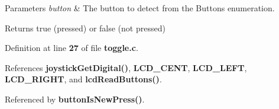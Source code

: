 \begin{DoxyParams}{Parameters}
{\em button} & The button to detect from the Buttons enumeration.\\
\hline
\end{DoxyParams}
\begin{DoxyReturn}{Returns}
true (pressed) or false (not pressed) 
\end{DoxyReturn}


Definition at line \textbf{ 27} of file \textbf{ toggle.\+c}.



References \textbf{ joystick\+Get\+Digital()}, \textbf{ L\+C\+D\+\_\+\+C\+E\+NT}, \textbf{ L\+C\+D\+\_\+\+L\+E\+FT}, \textbf{ L\+C\+D\+\_\+\+R\+I\+G\+HT}, and \textbf{ lcd\+Read\+Buttons()}.



Referenced by \textbf{ button\+Is\+New\+Press()}.


